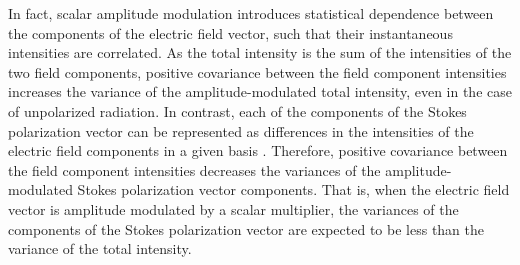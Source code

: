 \documentclass[twocolumn]{aastex6}
\begin{document}
In fact, scalar amplitude modulation introduces statistical dependence
between the components of the electric field vector, such that their
instantaneous intensities are correlated.
%
As the total intensity is the sum of the intensities of the two field
components, positive covariance between the field component
intensities increases the variance of the amplitude-modulated total
intensity, even in the case of unpolarized radiation.
%
In contrast, each of the components of the Stokes polarization vector 
can be represented as differences in the intensities of the electric field
components in a given basis \citep{bw70}.
%
%
Therefore, positive covariance between the field component
intensities decreases the variances of the amplitude-modulated Stokes
polarization vector components.
%
That is, when the electric field vector is amplitude modulated by a
scalar multiplier, the variances of the components of the Stokes
polarization vector are expected to be less than the variance of the
total intensity.
\end{document}
